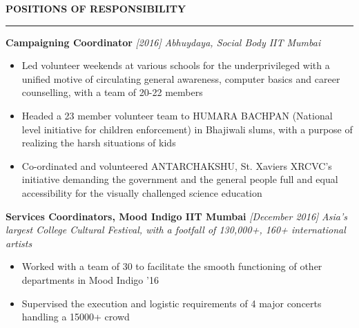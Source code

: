 \documentclass[10 pt]{article}%
\begin{document}
{{{{{{\begin{flushleft}\bf{\Large{\textcolor{color2}{POSITIONS OF RESPONSIBILITY}}}\end{flushleft}
\vspace{-5pt}
\hrule
\vspace{1 pt}
{\flushleft \textbf {\large{Campaigning Coordinator}} \hfill {{{\em{[2016]}}}}
	\vspace{-0.8em}
	{\flushleft \em{Abhuydaya, Social Body IIT Mumbai}}
	\vspace{-5pt}
	\begin{itemize}[leftmargin=*]
		\setlength\itemsep{1.5pt}
		\setlength\parskip{1.5pt}
		\item Led volunteer weekends at various schools for the underprivileged with a unified motive of circulating general awareness, computer basics and career counselling, with a team of 20-22 members
		\item Headed a 23 member volunteer team to HUMARA BACHPAN (National level initiative for children enforcement) in Bhajiwali slums, with a purpose of realizing the harsh situations of kids
			\item Co-ordinated and volunteered ANTARCHAKSHU, St. Xaviers XRCVC's  initiative demanding the government and the general people full and equal accessibility for the visually challenged science education
	\end{itemize}
{\flushleft \textbf {\large{Services Coordinators, Mood Indigo IIT Mumbai}} \hfill {{{\em{[December 2016]}}}}
	\vspace{-0.8em}
	{\flushleft \em{Asia's largest College Cultural Festival, with a footfall of 130,000+, 160+ international artists}}
	\vspace{-5pt}
	\begin{itemize}[leftmargin=*]
		\setlength\itemsep{1.5pt}
		\setlength\parskip{1.5pt}
		\item Worked with a team of 30 to facilitate the smooth functioning of other departments in Mood Indigo '16
		\item Supervised the execution and logistic requirements of 4 major concerts handling a 15000+ crowd
	\end{itemize}
}}}}}}}}
\end{document}
